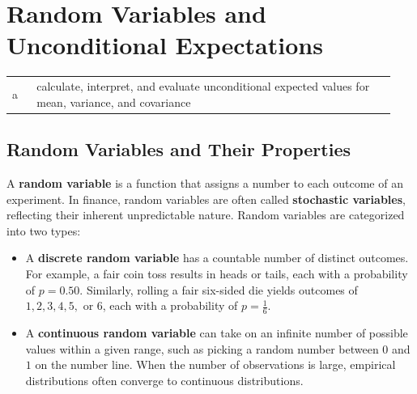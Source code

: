 

\section{Random Variables and Unconditional Expectations}
\label{sec:Random Variables and Unconditional Expectations}
\begin{center}
\begin{tabular}{p{0.06\linewidth} | p{0.88\linewidth}}
	a & calculate, interpret, and evaluate unconditional expected values for mean, variance, and covariance \\
\end{tabular}
\end{center}

\subsection{Random Variables and Their Properties}
	\label{subsec:Random Variables and Their Properties}
A \textbf{random variable} is a function that assigns a number to each outcome of an experiment. In finance, random variables are often called \textbf{stochastic variables}, reflecting their inherent unpredictable nature. Random variables are categorized into two types:
\begin{itemize}
	\item A \textbf{discrete random variable} has a countable number of distinct outcomes. For example, a fair coin toss results in heads or tails, each with a probability of $p = 0.50$. Similarly, rolling a fair six-sided die yields outcomes of $1, 2, 3, 4, 5,$ or $6$, each with a probability of $p = \frac{1}{6}$.
	\item A \textbf{continuous random variable} can take on an infinite number of possible values within a given range, such as picking a random number between $0$ and $1$ on the number line. When the number of observations is large, empirical distributions often converge to continuous distributions.
\end{itemize}

